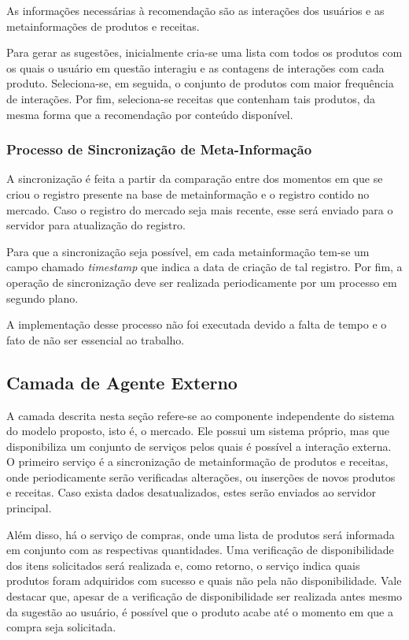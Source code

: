 As informações necessárias à recomendação são as interações dos usuários e as metainformações de produtos e receitas.

Para gerar as sugestões, inicialmente cria-se uma lista com todos os produtos com os quais o usuário em questão interagiu e as contagens de interações com cada produto. Seleciona-se, em seguida, o conjunto de produtos com maior frequência de interações. Por fim, seleciona-se receitas que contenham tais produtos, da mesma forma que a recomendação por conteúdo disponível.

\ProximoForaDoSumario 
\subsubsection{Processo de Sincronização de Meta-Informação}

A sincronização é feita a partir da comparação entre dos momentos em que se criou o registro presente na base de metainformação e o registro contido no mercado. Caso o registro do mercado seja mais recente, esse será enviado para o servidor para atualização do registro. 

Para que a sincronização seja possível, em cada metainformação tem-se um campo chamado  \textit{timestamp} que indica a data de criação de tal registro.
Por fim, a operação de sincronização deve ser realizada periodicamente por um processo em segundo plano.

A implementação desse processo não foi executada devido a falta de tempo e o fato de não ser essencial ao trabalho.


\subsection{Camada de Agente Externo}

A camada descrita nesta seção refere-se ao componente independente do sistema do modelo proposto, isto é, o mercado. Ele possui um sistema próprio, mas que disponibiliza um conjunto de serviços pelos quais é possível a interação externa. O primeiro serviço é a sincronização de metainformação de produtos e receitas, onde periodicamente serão verificadas alterações, ou inserções de novos produtos e receitas. Caso exista dados desatualizados, estes serão enviados ao servidor principal.

Além disso, há o serviço de compras, onde uma lista de produtos será informada em conjunto com as respectivas quantidades. Uma verificação de disponibilidade dos itens solicitados será realizada e, como retorno, o serviço indica quais produtos foram adquiridos com sucesso e quais não pela não disponibilidade. Vale destacar que, apesar de a verificação de disponibilidade ser realizada antes mesmo da sugestão ao usuário, é possível que o produto acabe até o momento em que a compra seja solicitada.
